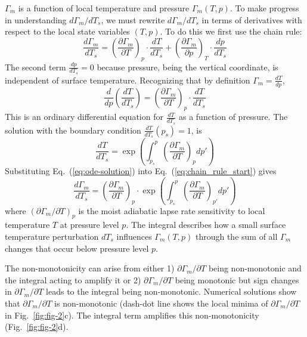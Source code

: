 \documentclass[draft,twocol]{ametsocV6.1}
\begin{document}
$\Gamma_m$ is a function of local temperature and pressure $\Gamma_m(T, p)$. To make progress in understanding $d\Gamma_m/dT_s$, we must rewrite $d\Gamma_m/dT_s$ in terms of derivatives with respect to the local state variables $(T, p)$. To do this we first use the chain rule: 
\begin{equation}
\frac{d\Gamma_m}{dT_s} = \left(\frac{\partial\Gamma_m}{\partial T}\right)_p \cdot \frac{dT}{dT_s} + \left(\frac{\partial\Gamma_m}{\partial p}\right)_T \cdot \frac{dp}{dT_s} \label{eq:chain_rule_start}
\end{equation}
The second term $\frac{dp}{dT_s}=0$ because pressure, being the vertical coordinate, is independent of surface temperature. Recognizing that by definition $\Gamma_m = \frac{dT}{dp}$,
\begin{equation}
    \frac{d}{dp}\left(\frac{dT}{dT_s}\right) = \left(\frac{\partial\Gamma_m}{\partial T}\right)_p \cdot \frac{dT}{dT_s} 
    \label{eq:ode}
\end{equation}
This is an ordinary differential equation for $\frac{dT}{dT_s}$ as a function of pressure. The solution with the boundary condition $\frac{dT}{dT_s}(p_s) = 1$, is
\begin{equation}
    \frac{dT}{dT_s} = \exp\left(\int_{p_s}^{p} \left(\frac{\partial\Gamma_m}{\partial T}\right)_p dp'\right)
    \label{eq:ode-solution}
\end{equation}
Substituting Eq.~(\ref{eq:ode-solution}) into Eq.~(\ref{eq:chain_rule_start}) gives
\begin{equation}
\frac{d\Gamma_m}{dT_s} = \left(\frac{\partial\Gamma_m}{\partial T}\right)_p \cdot \exp\left(\int_{p_s}^{p} \left(\frac{\partial\Gamma_m}{\partial T}\right)_{p'} dp'\right) \label{eq:total_sensitivity}
\end{equation}
where $(\partial\Gamma_m/\partial T)_p$ is the moist adiabatic lapse rate sensitivity to local temperature $T$ at pressure level $p$. The integral describes how a small surface temperature perturbation $dT_s$ influences $\Gamma_m(T, p)$ through the sum of all $\Gamma_m$ changes that occur below pressure level $p$.

The non-monotonicity can arise from either 1) $\partial\Gamma_m/\partial T$ being non-monotonic and the integral acting to amplify it or 2) $\partial\Gamma_m/\partial T$ being monotonic but sign changes in $\partial\Gamma_m/\partial T$ leads to the integral being non-monotonic. Numerical solutions show that $\partial\Gamma_m/\partial T$ is non-monotonic (dash-dot line shows the local minima of $\partial\Gamma_m/\partial T$ in Fig.~\ref{fig:fig-2}c). The integral term amplifies this non-monotonicity (Fig.~\ref{fig:fig-2}d).
\end{document}
